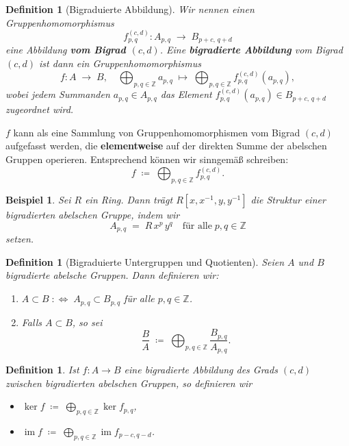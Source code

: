 \documentclass[12pt]{article}
\numberwithin{conj}{section}
\newtheorem{definition}[conj]{Definition}
\newtheorem{example}[conj]{Beispiel}
\newcommand{\Z}{\mathbb{Z}}
\newcommand{\ima}{\operatorname{im}}
\begin{document}
    \begin{definition}[Bigraduierte Abbildung]
        Wir nennen einen Gruppenhomomorphismus
        \[
            f^{(c,d)}_{p,q}: A_{p,q}\;\longrightarrow\; B_{p+c,\,q+d}
        \]
        eine Abbildung \textbf{vom Bigrad $(c,d)$}. Eine \textbf{bigradierte
        Abbildung} vom Bigrad $(c,d)$ ist dann ein Gruppenhomomorphismus
        \[
            f : A \;\longrightarrow\; B,\quad \bigoplus_{p,q \in \Z}a_{p,q}\;\longmapsto
            \; \bigoplus_{p,q \in \Z}f^{(c,d)}_{p,q}(a_{p,q}) ,
        \]
        wobei jedem Summanden $a_{p,q}\in A_{p,q}$ das Element
        $f^{(c,d)}_{p,q}(a_{p,q}) \in B_{p+c,\,q+d}$ zugeordnet wird.
    \end{definition}

    $f$ kann als eine Sammlung von Gruppenhomomorphismen vom Bigrad $(c,d)$
    aufgefasst werden, die \textbf{elementweise} auf der direkten Summe der
    abelschen Gruppen operieren. Entsprechend können wir sinngemäß schreiben:
    \[
        f \;\coloneq\; \bigoplus_{p,q \in \Z}f^{(c,d)}_{p,q}.
    \]

    \begin{example}
        Sei $R$ ein Ring. Dann trägt $R[x,x^{-1},y,y^{-1}]$ die Struktur einer
        bigradierten abelschen Gruppe, indem wir
        \[
            A_{p,q}\;=\; R\,x^{p}\,y^{q} \quad\text{für alle}\; p,q \in \Z
        \]
        setzen.
    \end{example}

    \begin{definition}[Bigraduierte Untergruppen und Quotienten]
        Seien $A$ und $B$ bigradierte abelsche Gruppen. Dann definieren wir:
        \begin{enumerate}[nolistsep]
            \item $A \subset B \;\colon\Leftrightarrow\; A_{p,q}\subset B_{p,q}$ für alle
                $p,q \in \Z$.

            \item Falls $A \subset B$, so sei
                \[
                    \displaystyle \frac{B}{A}\;\coloneqq\; \bigoplus_{p,q \in \Z}\frac{B_{p,q}}{A_{p,q}}
                    .
                \]
        \end{enumerate}
    \end{definition}

    \begin{definition}
        Ist $f: A \to B$ eine bigradierte Abbildung des Grads $(c,d)$ zwischen bigradierten
        abelschen Gruppen, so definieren wir
        \begin{itemize}[nolistsep]
            \item $\displaystyle \ker f \;\coloneqq\; \bigoplus_{p,q \in \Z}\ker  
                f_{p,q} $,

            \item $\displaystyle \ima f \;\coloneqq\; \bigoplus_{p,q \in \Z}\ima  
                f_{p-c,q-d} $.
        \end{itemize}
    \end{definition}
\end{document}
